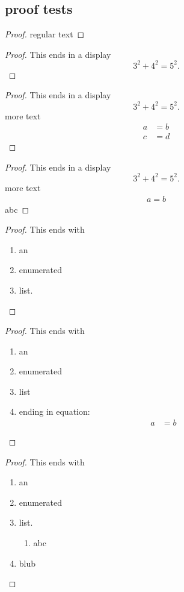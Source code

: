 \subsection{proof tests}

\begin{proof}
regular text
\end{proof}

\begin{proof}
  This ends in a display
  \[
    3^2 + 4^2 = 5^2.
  \]
\end{proof}

\begin{proof}
  This ends in a display
  \[
    3^2 + 4^2 = 5^2.
  \]
more text
\begin{align}
a&=b \\
c&=d
\end{align}
\end{proof}

\begin{proof}
  This ends in a display
  \[
    3^2 + 4^2 = 5^2.
  \]
more text
\begin{align*}
a=b
\end{align*}
abc
\end{proof}

\begin{proof}
  This ends with
  \begin{enumerate}
  \item an
  \item enumerated
  \item list.
  \end{enumerate}
\end{proof}

\begin{proof}
  This ends with
  \begin{enumerate}
  \item an
  \item enumerated
  \item list
  \item ending in equation:
  \begin{align*}
  a&=b
  \end{align*}
  \end{enumerate}
\end{proof}

\begin{proof}
  This ends with
  \begin{enumerate}
  \item an
  \item enumerated
  \item list.
  \begin{enumerate}
  \item abc
  \end{enumerate}
  \item blub
  \end{enumerate}
\end{proof}

